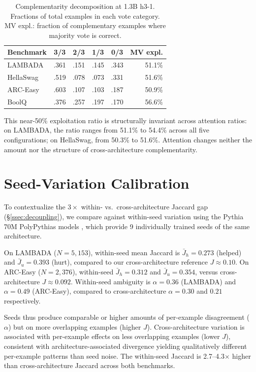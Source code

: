 \begin{table}[ht]
\centering
\small
\caption{Complementarity decomposition at 1.3B h3-1. Fractions of total examples in each vote category. MV expl.: fraction of complementary examples where majority vote is correct.}
\label{tab:complementarity_full}
\begin{tabular}{@{}lccccr@{}}
\toprule
Benchmark & 3/3 & 2/3 & 1/3 & 0/3 & MV expl. \\
\midrule
LAMBADA & .361 & .151 & .145 & .343 & 51.1\% \\
HellaSwag & .519 & .078 & .073 & .331 & 51.6\% \\
ARC-Easy & .603 & .107 & .103 & .187 & 50.9\% \\
BoolQ & .376 & .257 & .197 & .170 & 56.6\% \\
\bottomrule
\end{tabular}
\end{table}

This near-50\% exploitation ratio is structurally invariant across attention ratios: on LAMBADA, the ratio ranges from 51.1\% to 54.4\% across all five configurations; on HellaSwag, from 50.3\% to 51.6\%. Attention changes neither the amount nor the structure of cross-architecture complementarity.

\section{Seed-Variation Calibration}\label{app:seed_calibration}

To contextualize the $3\times$ within- vs.\ cross-architecture Jaccard gap (\S\ref{ssec:decoupling}), we compare against within-seed variation using the Pythia 70M \citep{biderman2023pythia} PolyPythias models \citep{vanderwal2025polypythias}, which provide 9 individually trained seeds of the same architecture.

On LAMBADA ($N = 5{,}153$), within-seed mean Jaccard is $\bar{J}_h = 0.273$ (helped) and $\bar{J}_u = 0.393$ (hurt), compared to our cross-architecture reference $J \approx 0.10$. On ARC-Easy ($N = 2{,}376$), within-seed $\bar{J}_h = 0.312$ and $\bar{J}_u = 0.354$, versus cross-architecture $J \approx 0.092$. Within-seed ambiguity is $\alpha = 0.36$ (LAMBADA) and $\alpha = 0.49$ (ARC-Easy), compared to cross-architecture $\alpha = 0.30$ and $0.21$ respectively.

Seeds thus produce comparable or higher amounts of per-example disagreement ($\alpha$) but on more overlapping examples (higher $J$). Cross-architecture variation is associated with per-example effects on less overlapping examples (lower $J$), consistent with architecture-associated divergence yielding qualitatively different per-example patterns than seed noise. The within-seed Jaccard is 2.7--4.3$\times$ higher than cross-architecture Jaccard across both benchmarks.

